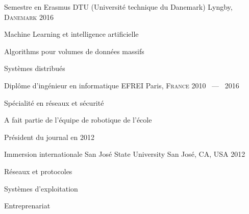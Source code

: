 

\begin{cventries}

  \cventry
    {Semestre en Erasmus}
    {DTU (Université technique du Danemark)}
    {Lyngby, \textsc{Danemark} \emojiflagdk}
    {2016}
    {
      \begin{cvitems}
        \item {Machine Learning et intelligence artificielle}
        \item {Algorithms pour volumes de données massifs}
        \item {Systèmes distribués}
      \end{cvitems}
    }

  \cventry
    {Diplôme d'ingénieur en informatique} %
    {EFREI} %
    {Paris, \textsc{France} \emojiflagfr} %
    {2010 ~---~ 2016} %
    {
      \begin{cvitems} %
        \item {Spécialité en réseaux et sécurité}
        \item {A fait partie de l'équipe de robotique de l'école}
        \item {Président du journal en 2012}
      \end{cvitems}
    }


  \cventry
    {Immersion internationale}
    {San José State University}
    {San José, CA, USA \emojiflagus}
    {2012}
    {
      \begin{cvitems}
        \item {Réseaux et protocoles}
        \item {Systèmes d'exploitation}
        \item {Entreprenariat}
      \end{cvitems}
    }

\end{cventries}

